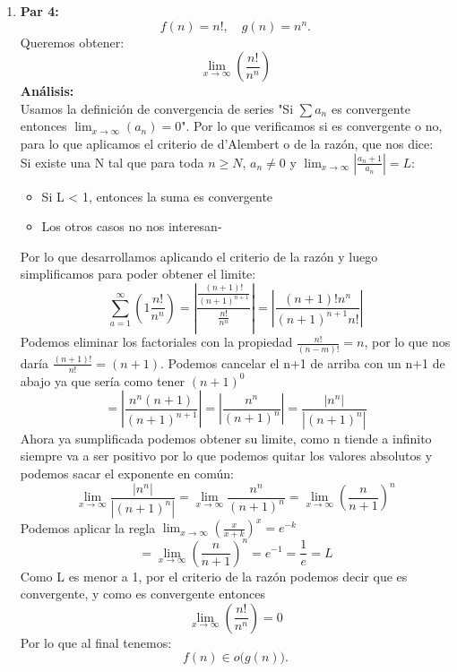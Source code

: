 \documentclass[12pt]{article}
\begin{document}
\begin{enumerate}
  \item \textbf{Par 4:} 
  \[
    f(n) = n!, \quad g(n) = n^{n}.
  \]
  Queremos obtener:
  \[
  \lim_{x \to \infty}(\frac{n!}{n^n})
  \]
  \textbf{Análisis:}\\
  Usamos la definición de convergencia de series "Si $\sum a_n$ es convergente entonces $\lim_{x \to \infty}(a_n)=0$". Por lo que verificamos si es convergente o no, para lo que aplicamos el criterio de d'Alembert o de la razón, que nos dice:
  \\ Si existe una N tal que para toda $n \geq N$, $a_n \neq 0$ y $\lim_{x \to \infty}|\frac{a_n+1}{a_n}|=L$:
  \begin{itemize}
      \item Si L < 1, entonces la suma es convergente
      \item Los otros casos no nos interesan-
  \end{itemize}
  Por lo que desarrollamos aplicando el criterio de la razón y luego simplificamos para poder obtener el limite:
  \[
  \sum_{a=1}^{\infty}(1\frac{n!}{n^n}) = |\frac{\frac{(n+1)!}{(n+1)^{n+1}}}{\frac{n!}{n^n}}| = |\frac{(n+1)!n^n}{(n+1)^{n+1}n!}|
  \]
  Podemos eliminar los factoriales con la propiedad $\frac{n!}{(n-m)!}=n$, por lo que nos daría $\frac{(n+1)!}{n!}=(n+1)$. Podemos cancelar el n+1 de arriba con un n+1 de abajo ya que sería como tener $(n+1)^0$
  \[
  = |\frac{n^n(n+1)}{(n+1)^{n+1}}| = |\frac{n^n}{(n+1)^{n}}| = \frac{|n^n|}{|(n+1)^{n}|}
  \]
  Ahora ya sumplificada podemos obtener su limite, como n tiende a infinito siempre va a ser positivo por lo que podemos quitar los valores absolutos y podemos sacar el exponente en común:
  \[
  \lim_{x \to \infty}\frac{|n^n|}{|(n+1)^{n}|} = \lim_{x \to \infty}\frac{n^n}{(n+1)^{n}} = \lim_{x \to \infty}(\frac{n}{n+1})^{n}
  \]
  Podemos aplicar la regla $\lim_{x \to \infty}(\frac{x}{x+k})^x=e^{-k}$
  \[
  = \lim_{x \to \infty}(\frac{n}{n+1})^{n} = e^{-1} = \frac{1}{e} = L
  \]
Como L es menor a 1, por el criterio de la razón podemos decir que es convergente, y como es convergente entonces
  \[
  \lim_{x \to \infty}(\frac{n!}{n^n}) = 0
  \]
  Por lo que al final tenemos:
  \[
    f(n) \in o\bigl(g(n)\bigr).
  \]


\end{enumerate}
\end{document}
